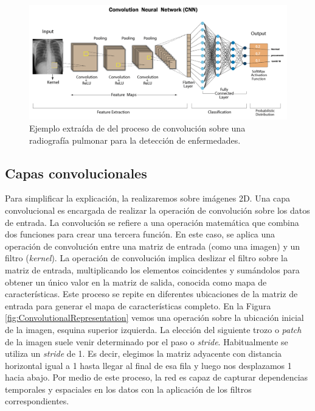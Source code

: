 \begin{figure}[htp]
  \centering
  \includegraphics[width=\textwidth]{imagenes/chapter2/RadiographyConvolutionExample.png}
  \caption[Ejemplo de red convolucional para imágenes médicas]{Ejemplo extraída de \cite{RadiographyConvolutionExample} del proceso de convolución sobre una radiografía pulmonar 
  para la detección de enfermedades.}
  \label{fig:RadiographyConvolutionExample}
\end{figure}

\subsection{Capas convolucionales}
Para simplificar la explicación, la realizaremos sobre imágenes 2D. 
Una capa convolucional es encargada de realizar la operación de convolución sobre 
los datos de entrada. 
La convolución se refiere a una operación matemática que combina dos funciones para crear una tercera función.
En este caso, se aplica una operación de convolución 
entre una matriz de entrada (como una imagen) y un filtro (\emph{kernel}).
La operación de convolución implica deslizar el filtro sobre la matriz de entrada, 
multiplicando los elementos coincidentes y sumándolos para obtener un único valor 
en la matriz de salida, conocida como mapa de características. 
Este proceso se repite en diferentes ubicaciones de la matriz de 
entrada para generar el mapa de características completo. En la Figura 
\ref{fig:ConvolutionalRepresentation} vemos una operación sobre la ubicación 
inicial de la imagen, esquina superior izquierda. 
La elección del siguiente trozo 
o \emph{patch} de la imagen suele venir determinado por el paso o \emph{stride}.
Habitualmente se utiliza un \emph{stride} de 1. Es decir, elegimos la matriz 
adyacente con distancia horizontal igual a 1 hasta llegar al final de esa fila 
y luego nos desplazamos 1 hacia abajo. 
Por medio de este proceso, la red es capaz de
capturar dependencias temporales y espaciales en los datos con la aplicación
de los filtros correspondientes.

